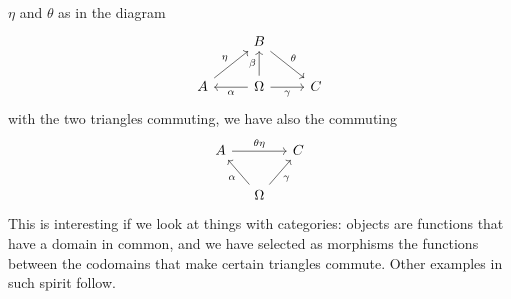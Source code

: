 \begin{example}
  \(\eta\) and \(\theta\) as in the diagram
  \[\begin{tikzcd}
      & B \ar["\theta", dr] & \\
      A \ar["\eta", ur] & \Omega \ar["\alpha", l] \ar["\beta", u]
      \ar["\gamma", r, swap] & C
    \end{tikzcd}\] with the two triangles commuting, we have also the
  commuting
  \[\begin{tikzcd}[column sep=small]
      A \ar["\theta\eta", rr] & & C \\
      & \Omega \ar["\alpha", ul] \ar["\gamma", ur, swap]
    \end{tikzcd}\] This is interesting if we look at things with
  categories: objects are functions that have a domain in common, and
  we have selected as morphisms the functions between the codomains
  that make certain triangles commute. Other examples in such spirit
  follow.
\end{example}


